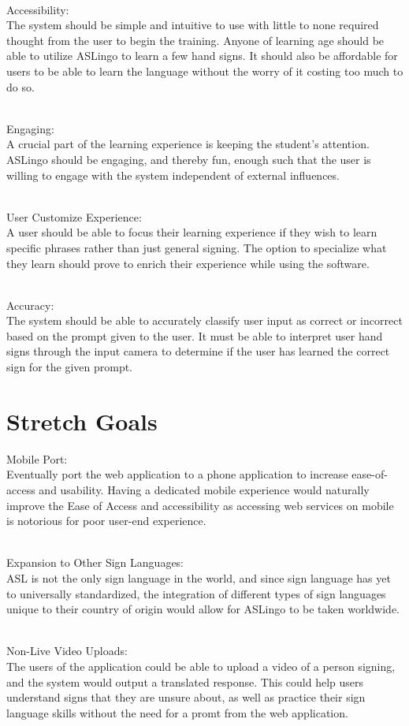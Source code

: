 \documentclass{article}
\begin{document}
~\\Accessibility:\\
The system should be simple and intuitive to use with little to none required thought from the user to begin the training. Anyone of learning age should be able to utilize ASLingo to learn a few hand signs. It should also be affordable for users to be able to learn the language without the worry of it costing too much to do so. 

~\\Engaging:\\
A crucial part of the learning experience is keeping the student's attention. ASLingo should be engaging, and thereby fun, enough such that the user is willing to engage with the system independent of external influences.

~\\User Customize Experience:\\
A user should be able to focus their learning experience if they wish to learn specific phrases rather than just general signing. The option to specialize what they learn should prove to enrich their experience while using the software.

~\\Accuracy:\\
The system should be able to accurately classify user input as correct or incorrect based on the prompt given to the user. It must be able to interpret user hand signs through the input camera to determine if the user has learned the correct sign for the given prompt. 

\section{Stretch Goals}

Mobile Port:\\
Eventually port the web application to a phone application to increase ease-of-access and usability. Having a dedicated mobile experience would naturally improve the Ease of Access and accessibility as accessing web services on mobile is notorious for poor user-end experience.

~\\Expansion to Other Sign Languages:\\
ASL is not the only sign language in the world, and since sign language has yet to universally standardized, the integration of different types of sign languages unique to their country of origin would allow for ASLingo to be taken worldwide.

~\\Non-Live Video Uploads:\\
The users of the application could be able to upload a video of a person signing, and the system would output a translated response. This could help users understand signs that they are unsure about, as well as practice their sign language skills without the need for a promt from the web application. 
\end{document}
